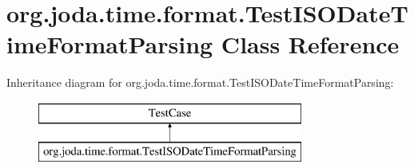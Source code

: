 \hypertarget{classorg_1_1joda_1_1time_1_1format_1_1_test_i_s_o_date_time_format_parsing}{\section{org.\-joda.\-time.\-format.\-Test\-I\-S\-O\-Date\-Time\-Format\-Parsing Class Reference}
\label{classorg_1_1joda_1_1time_1_1format_1_1_test_i_s_o_date_time_format_parsing}
}
Inheritance diagram for org.\-joda.\-time.\-format.\-Test\-I\-S\-O\-Date\-Time\-Format\-Parsing\-:\begin{figure}[H]
\begin{center}
\leavevmode
\includegraphics[height=2.000000cm]{classorg_1_1joda_1_1time_1_1format_1_1_test_i_s_o_date_time_format_parsing}
\end{center}
\end{figure}
